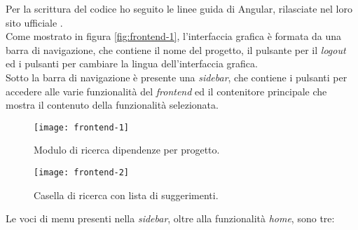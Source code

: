 Per la scrittura del codice ho seguito le linee guida di Angular, rilasciate nel loro sito ufficiale \cite{site:angular-style-guide}.\\

Come mostrato in figura \ref*{fig:frontend-1}, l'interfaccia grafica è formata da una barra di navigazione, che contiene il nome del progetto,
il pulsante per il \textit{logout} ed i pulsanti per cambiare la lingua dell'interfaccia grafica.\\
Sotto la barra di navigazione è presente una \textit{sidebar}, che contiene i pulsanti per accedere alle varie funzionalità del \textit{frontend} 
ed il contenitore principale che mostra il contenuto della funzionalità selezionata.\\
\begin{figure}[!h]
  \centering
  \begin{minipage}{0.45\textwidth}
      \centering
      \texttt{[image: frontend-1]}
      \caption{Modulo di ricerca dipendenze per progetto.}
      \label{fig:frontend-1}
  \end{minipage}\hfill
  \begin{minipage}{0.45\textwidth}
      \centering
      \texttt{[image: frontend-2]}
      \caption{Casella di ricerca con lista di suggerimenti.}
      \label{fig:frontend-2}
  \end{minipage}
\end{figure}
Le voci di menu presenti nella \textit{sidebar}, oltre alla funzionalità \textit{home}, sono tre:
